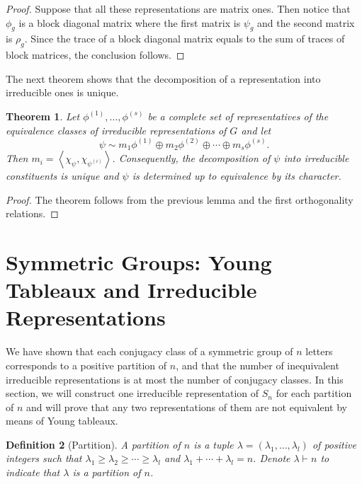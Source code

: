 \documentclass{assignment}[2019/10/15]
\newcommand{\lr}[3]{\left#1#3\right#2}
\theoremstyle{plain}
\newtheorem{theorem}{Theorem}[section]
\newtheorem{definition}[theorem]{Definition}
\numberwithin{equation}{section}
\begin{document}
    \begin{proof}
        Suppose that all these representations are matrix ones. Then notice that $\phi_g$ is a block diagonal matrix where the first matrix is $\psi_g$ and the second matrix is $\rho_g$. Since the trace of a block diagonal matrix equals to the sum of traces of block matrices, the conclusion follows.
    \end{proof}

    The next theorem shows that the decomposition of a representation into irreducible ones is unique.

    \begin{theorem}
        Let $\phi^{(1)}, \dotsc, \phi^{(s)}$ be a complete set of representatives of the equivalence classes of irreducible representations of $G$ and let
        \begin{equation}
            \psi\sim m_1\phi^{(1)}\oplus m_2\phi^{(2)}\oplus\dotsb\oplus m_s\phi^{(s)}.
        \end{equation}
        Then $m_i=\lr<>{\chi_\psi, \chi_{\psi^{(i)}}}$. Consequently, the decomposition of $\psi$ into irreducible constituents is unique and $\psi$ is determined up to equivalence by its character.
    \end{theorem}

    \begin{proof}
        The theorem follows from the previous lemma and the first orthogonality relations.
    \end{proof}

    \section{Symmetric Groups: Young Tableaux and Irreducible Representations}

    We have shown that each conjugacy class of a symmetric group of $n$ letters corresponds to a positive partition of $n$, and that the number of inequivalent irreducible representations is at most the number of conjugacy classes. In this section, we will construct one irreducible representation of $S_n$ for each partition of $n$ and will prove that any two representations of them are not equivalent by means of Young tableaux.

    \begin{definition}[Partition]
        A \emph{partition} of $n$ is a tuple $\lambda = (\lambda_1, \dotsc, \lambda_l)$ of positive integers such that $\lambda_1\geq \lambda_2\geq \dotsb \geq \lambda_l$ and $\lambda_1+\dotsb + \lambda_l=n$. Denote $\lambda\vdash n$ to indicate that $\lambda$ is a partition of $n$.
    \end{definition}
\end{document}
